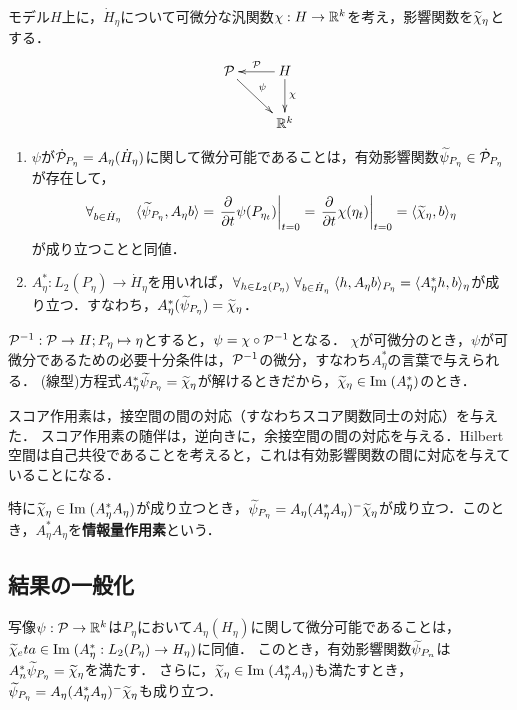 \documentclass[uplatex,dvipdfmx]{jsreport}
\begin{document}
\begin{lemma}
    モデル$H$上に，$\dot{H}_\eta$について可微分な汎関数$\chi:H\to\R^k$を考え，影響関数を$\wt{\chi}_\eta$とする．
    \[\xymatrix{
        \P\ar[dr]^-{\psi}&H\ar[l]_-\P\ar[d]^-\chi\\&\R^k
    }\]
    \begin{enumerate}
        \item $\psi$が$\dot{\P}_{P_\eta}=A_\eta(\dot{H}_\eta)$に関して微分可能であることは，有効影響関数$\wt{\psi}_{P_\eta}\in\dot{\P}_{P_\eta}$が存在して，
        \[\forall_{b\in\dot{H}_\eta}\quad\brac{\wt{\psi}_{P_\eta},A_\eta b}=\left.\pp{}{t}\psi(P_{\eta_t})\right|_{t=0}=\left.\pp{}{t}\chi(\eta_t)\right|_{t=0}=\brac{\wt{\chi}_\eta,b}_\eta\]
        が成り立つことと同値．
        \item $A^*_\eta:L_2(P_\eta)\to \dot{H}_\eta$を用いれば，$\forall_{h\in L_2(P_\eta)}\;\forall_{b\in\dot{H}_\eta}\;\brac{h,A_\eta b}_{P_\eta}=\brac{A^*_\eta h,b}_\eta$が成り立つ．すなわち，$A^*_\eta(\wt{\psi}_{P_\eta})=\wt{\chi}_\eta$．
    \end{enumerate}
\end{lemma}
\begin{remarks}
    $\P^{-1}:\P\to H;P_\eta\mapsto\eta$とすると，$\psi=\chi\circ \P^{-1}$となる．
    $\chi$が可微分のとき，$\psi$が可微分であるための必要十分条件は，$\P^{-1}$の微分，すなわち$A_\eta^*$の言葉で与えられる．
    (線型)方程式$A^*_\eta\wt{\psi}_{P_\eta}=\wt{\chi}_\eta$が解けるときだから，$\wt{\chi}_\eta\in\Im(A^*_\eta)$のとき．

    スコア作用素は，接空間の間の対応（すなわちスコア関数同士の対応）を与えた．
    スコア作用素の随伴は，逆向きに，余接空間の間の対応を与える．Hilbert空間は自己共役であることを考えると，これは有効影響関数の間に対応を与えていることになる．
\end{remarks}

\begin{definition}
    特に$\wt{\chi}_\eta\in\Im(A^*_\eta A_\eta)$が成り立つとき，$\wt{\psi}_{P_\eta}=A_\eta(A^*_\eta A_\eta)^-\wt{\chi}_\eta$が成り立つ．このとき，$A^*_\eta A_\eta$を\textbf{情報量作用素}という．
\end{definition}

\subsection{結果の一般化}

\begin{theorem}
    写像$\psi:\P\to\R^k$は$P_\eta$において$A_\eta(H_\eta)$に関して微分可能であることは，$\wt{\chi}_eta\in\Im(A^*_\eta:L_2(P_\eta)\to H_\eta)$に同値．
    このとき，有効影響関数$\wt{\psi}_{P_n}$は$A^*_n\wt{\psi}_{P_\eta}=\wt{\chi}_\eta$を満たす．
    さらに，$\wt{\chi}_\eta\in\Im(A^*_\eta A_\eta)$も満たすとき，$\wt{\psi}_{P_\eta}=A_\eta(A^*_\eta A_\eta)^-\wt{\chi}_\eta$も成り立つ．
\end{theorem}
\end{document}
